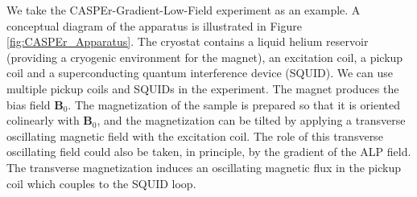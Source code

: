 We take the CASPEr-Gradient-Low-Field experiment as an example. 
A conceptual diagram of the apparatus is illustrated in Figure\,\ref{fig:CASPEr_Apparatus}. 
The cryostat contains a liquid helium reservoir (providing a cryogenic environment for the magnet), an excitation coil, a pickup coil and a superconducting quantum interference device (SQUID). We can use multiple pickup coils and SQUIDs in the experiment. The magnet produces the bias field $\mathbf{B}_0$. The magnetization of the sample is prepared so that it is oriented colinearly with $\mathbf{B}_0$, and the magnetization can be tilted by applying a transverse oscillating magnetic field with the excitation coil. The role of this transverse oscillating field could also be taken, in principle, by the gradient of the ALP field.
The transverse magnetization induces an oscillating magnetic flux in the pickup coil which couples to the SQUID loop. 

